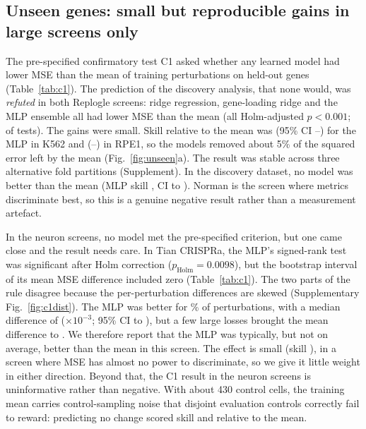 \subsection{Unseen genes: small but reproducible gains in large screens only}
The pre-specified confirmatory test C1 asked whether any learned model had lower MSE than the mean of training perturbations on held-out genes (Table~\ref{tab:c1}). The prediction of the discovery analysis, that none would, was \emph{refuted} in both Replogle screens: ridge regression, gene-loading ridge and the MLP ensemble all had lower MSE than the mean (all Holm-adjusted $p<0.001$; \numNCOneBeat{} of \numNCOneTests{} tests). The gains were small. Skill relative to the mean was \numSkillReplogleKEssentialMlpEnsemble{} (95\% CI \numSkillLoReplogleKEssentialMlpEnsemble--\numSkillHiReplogleKEssentialMlpEnsemble) for the MLP in K562 and \numSkillReplogleRpeMlpEnsemble{} (\numSkillLoReplogleRpeMlpEnsemble--\numSkillHiReplogleRpeMlpEnsemble) in RPE1, so the models removed about 5\% of the squared error left by the mean (Fig.~\ref{fig:unseen}a). The result was stable across three alternative fold partitions (Supplement). In the discovery dataset, no model was better than the mean (MLP skill \numSkillNormanMlpEnsemble, CI \numSkillLoNormanMlpEnsemble{} to \numSkillHiNormanMlpEnsemble). Norman is the screen where metrics discriminate best, so this is a genuine negative result rather than a measurement artefact.

In the neuron screens, no model met the pre-specified criterion, but one came close and the result needs care. In Tian CRISPRa, the MLP's signed-rank test was significant after Holm correction ($p_{\mathrm{Holm}}=0.0098$), but the bootstrap interval of its mean MSE difference included zero (Table~\ref{tab:c1}). The two parts of the rule disagree because the per-perturbation differences are skewed (Supplementary Fig.~\ref{fig:c1dist}). The MLP was better for \numTianAMlpFracBetter\% of perturbations, with a median difference of \numTianAMlpMedian{} ($\times10^{-3}$; 95\% CI \numTianAMlpMedianLo{} to \numTianAMlpMedianHi), but a few large losses brought the mean difference to \numTianAMlpMean. We therefore report that the MLP was typically, but not on average, better than the mean in this screen. The effect is small (skill \numSkillTianCrispraMlpEnsemble), in a screen where MSE has almost no power to discriminate, so we give it little weight in either direction. Beyond that, the C1 result in the neuron screens is uninformative rather than negative. With about 430 control cells, the training mean carries control-sampling noise that disjoint evaluation controls correctly fail to reward: predicting no change scored skill \numZeroSkillTianCrispra{} and \numZeroSkillTianCrispri{} relative to the mean.

